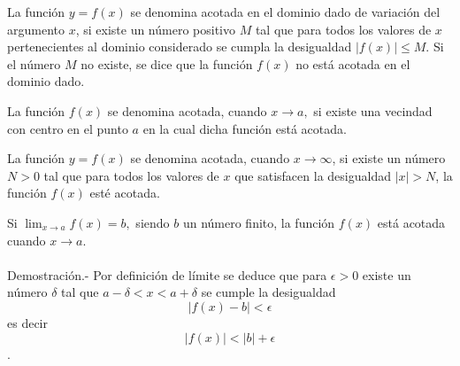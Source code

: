     \begin{tcolorbox}[colframe=white]
	\begin{def.}
	    La función $y=f(x)$ se denomina acotada en el dominio dado de variación del argumento $x$, si existe un número positivo $M$ tal que para todos los valores de $x$ pertenecientes al dominio considerado se cumpla la desigualdad $|f(x)|\leq M.$ Si el número $M$ no existe, se dice que la función $f(x)$ no está acotada en el dominio dado.
	\end{def.}
    \end{tcolorbox}

    \begin{tcolorbox}[colframe=white]
	\begin{def.}
	    La función $f(x)$ se denomina acotada, cuando $x \to a,$ si existe una vecindad con centro en el punto $a$ en la cual dicha función está acotada.
	\end{def.}
    \end{tcolorbox}

    \begin{tcolorbox}[colframe=white]
	\begin{def.}
	    La función $y=f(x)$ se denomina acotada, cuando $x \to \infty$, si existe un número $N>0$ tal que para todos los valores de $x$ que satisfacen la desigualdad $|x| > N$, la función $f(x)$ esté acotada.
	\end{def.}
    \end{tcolorbox}

    \begin{teo}
	Si $\displaystyle\lim_{x \to a} f(x) = b,$ siendo $b$ un número finito, la función $f(x)$ está acotada cuando $x\to a$.\\\\
	    Demostración.-\; Por definición de límite se deduce que para $\epsilon > 0$ existe un número $\delta$ tal que $a-\delta<x<a+\delta$ se cumple la desigualdad $$|f(x) - b| < \epsilon$$ es decir $$|f(x)|<|b|+\epsilon$$.\\\\
    \end{teo}

